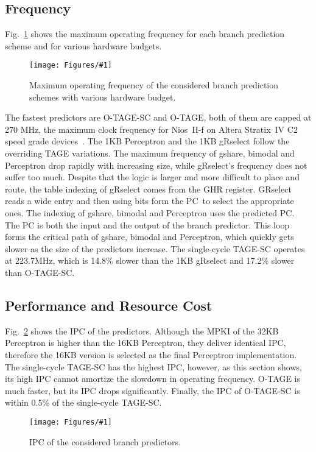\documentclass[conference]{IEEEtran}
\newcommand{\kfig}[4]{ %
        \begin{figure}[!t]
        \centering
        \texttt{[image: Figures/\#1]}
        \vspace{-1mm}
        \caption{#3}
        \label{#2}
        \end{figure}
}
\begin{document}
\subsection{Frequency}
\label{sec:eval:fmax}
Fig.~\ref{fig:adfmax} shows the maximum operating frequency for each branch prediction scheme and for various hardware budgets.
\kfig{adfmax.pdf}{fig:adfmax}{Maximum operating frequency of the considered branch prediction schemes with various hardware budget.}{angle = 0, trim = 0.8in 4.6in 0.7in 5.2in, clip, width=0.5\textwidth}

The fastest predictors are \mbox{O-TAGE-SC} and \mbox{O-TAGE}, both of them are capped at 270 MHz, the maximum clock frequency for Nios~II-f on Altera Stratix~IV C2 speed grade devices~\cite{niosfmax}. The 1KB Perceptron and the 1KB gRselect follow the overriding TAGE variations. The maximum frequency of gshare, bimodal and Perceptron drop rapidly with increasing size, while gRselect's frequency does not suffer too much. Despite that the logic is larger and more difficult to place and route,  the table indexing of gRselect comes from the GHR register. GRselect reads a wide entry and then using bits form the PC\ to select the appropriate ones. The indexing of gshare, bimodal and Perceptron uses  the predicted PC. The PC is both the input and the output of the branch predictor. This loop forms the critical path of gshare, bimodal and Perceptron, which quickly gets slower as the size of the predictors increase. The single-cycle \mbox{TAGE-SC} operates at 223.7MHz, which is 14.8\% slower than the 1KB gRselect and 17.2\% slower than \mbox{O-TAGE-SC}.

\subsection{Performance and Resource Cost}
\label{sec:eval:perf}
Fig.~\ref{fig:adipc} shows the IPC of the predictors. Although the MPKI of the 32KB Perceptron is higher than the 16KB Perceptron, they deliver identical IPC, therefore the 16KB version is selected as the final Perceptron implementation. The single-cycle \mbox{TAGE-SC} has the highest IPC, however, as this section shows, its high IPC cannot amortize the slowdown in operating frequency. \mbox{O-TAGE} is much faster, but its IPC drops significantly. Finally, the IPC of \mbox{O-TAGE-SC} is within 0.5\% of the single-cycle \mbox{TAGE-SC}.
\kfig{adipc.pdf}{fig:adipc}{IPC of the considered branch predictors.}{angle = 0, trim = 0.9in 2.9in 0.8in 2.9in, clip, width=0.5\textwidth}
\end{document}
